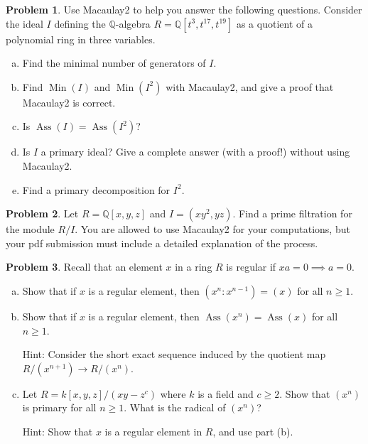 \documentclass[11pt]{article}
\DeclareMathOperator{\Ass}{Ass}
\DeclareMathOperator{\Min}{Min}
\theoremstyle{definition}
\newtheorem{problem}{Problem}
\begin{document}
\begin{problem}
	Use Macaulay2 to help you answer the following questions. Consider the ideal $I$ defining the $\mathbb{Q}$-algebra $R=\mathbb{Q}[t^3,t^{17},t^{19}]$ as a quotient of a polynomial ring in three variables.
	\begin{enumerate}[(a)]
		\item Find the minimal number of generators of $I$.
		\item Find $\Min(I)$ and $\Min(I^2)$ with Macaulay2, and give a proof that Macaulay2 is correct.
		\item Is $\Ass(I) = \Ass(I^2)$?
		\item Is $I$ a primary ideal? Give a complete answer (with a proof!) without using Macaulay2.
		\item Find a primary decomposition for $I^2$.
	\end{enumerate}
\end{problem}


\begin{problem}
	Let $R = \mathbb{Q}[x,y,z]$ and $I = (xy^2,yz)$. Find a prime filtration for the module $R/I$. You are allowed to use Macaulay2 for your computations, but your pdf submission must include a detailed explanation of the process. 
\end{problem}



\begin{problem}
	Recall that an element $x$ in a ring $R$ is regular if $xa = 0 \implies a = 0$. 
	\begin{enumerate}[a)]
		\item Show that if $x$ is a regular element, then $(x^n : x^{n-1}) = (x)$ for all $n \geqslant 1$.
		\item Show that if $x$ is a regular element, then $\Ass(x^n) = \Ass(x)$ for all $n \geqslant 1$.
		
		\noindent
		Hint: Consider the short exact sequence induced by the quotient map $R/(x^{n+1}) \to R/(x^n)$.
		
		\item Let $R = k[x,y,z]/(xy-z^c)$ where $k$ is a field and $c \geqslant 2$. Show that $(x^n)$ is primary for all $n \geqslant 1$. What is the radical of $(x^n)$?
		
		
		\noindent
		Hint: Show that $x$ is a regular element in $R$, and use part (b).
	\end{enumerate}	
\end{problem}


\newpage
\end{document}
